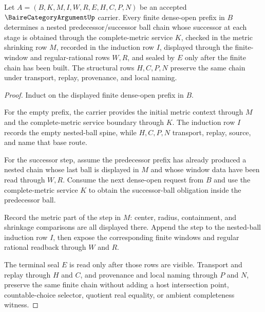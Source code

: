\begin{theorem}
\label{thm:baire-category-argument-nested-ball-induction}
Let $A=(B,K,M,I,W,R,E,H,C,P,N)$ be an accepted $\BaireCategoryArgumentUp$ carrier. Every finite dense-open prefix in $B$ determines a nested predecessor/successor ball chain whose successor at each stage is obtained through the complete-metric service $K$, checked in the metric shrinking row $M$, recorded in the induction row $I$, displayed through the finite-window and regular-rational rows $W,R$, and sealed by $E$ only after the finite chain has been built. The structural rows $H,C,P,N$ preserve the same chain under transport, replay, provenance, and local naming.
\end{theorem}
\begin{proof}
Induct on the displayed finite dense-open prefix in $B$.

For the empty prefix, the carrier provides the initial metric context through $M$ and the complete-metric service boundary through $K$. The induction row $I$ records the empty nested-ball spine, while $H,C,P,N$ transport, replay, source, and name that base route.

For the successor step, assume the predecessor prefix has already produced a nested chain whose last ball is displayed in $M$ and whose window data have been read through $W,R$. Consume the next dense-open request from $B$ and use the complete-metric service $K$ to obtain the successor-ball obligation inside the predecessor ball.

Record the metric part of the step in $M$: center, radius, containment, and shrinkage comparisons are all displayed there. Append the step to the nested-ball induction row $I$, then expose the corresponding finite windows and regular rational readback through $W$ and $R$.

The terminal seal $E$ is read only after those rows are visible. Transport and replay through $H$ and $C$, and provenance and local naming through $P$ and $N$, preserve the same finite chain without adding a host intersection point, countable-choice selector, quotient real equality, or ambient completeness witness.
\end{proof}

